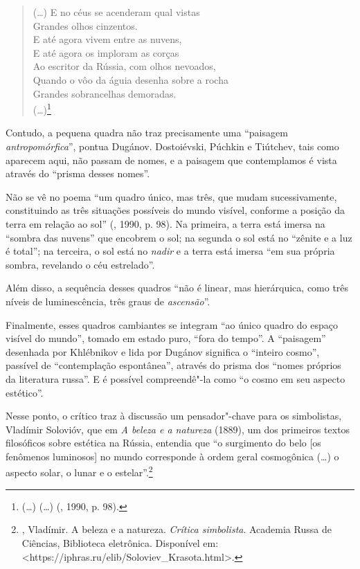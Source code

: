 \begin{verse}
(\ldots{})
E no céus se acenderam qual vistas \\
Grandes olhos cinzentos. \\
E até agora vivem entre as nuvens, \\
E até agora os imploram as corças \\
Ao escritor da Rússia, com olhos nevoados, \\
Quando o vôo da águia desenha sobre a \qb{}rocha \\
Grandes sobrancelhas demoradas. \\
(\ldots{})\footnote{(\ldots{}) {} (\ldots{}) (, 1990, p.
  98).}
\end{verse}

Contudo, a pequena quadra não traz precisamente uma ``paisagem
\emph{antropomórfica}'', pontua Dugánov. Dostoiévski, Púchkin e
Tiútchev, tais como aparecem aqui, não passam de nomes, e a paisagem que
contemplamos é vista através do ``prisma desses nomes''.

Não se vê no poema ``um quadro único, mas três, que
mudam sucessivamente, constituindo as três situações possíveis do mundo
visível, conforme a posição da terra em relação ao sol'' (, 1990, p. 98). Na primeira, a
terra está imersa na ``sombra das nuvens'' que encobrem o sol; na segunda o
sol está no ``zênite e a luz é total''; na terceira, o sol está no \emph{nadir} e a
terra está imersa ``em sua própria sombra, revelando o céu estrelado''.

Além disso, a sequência desses quadros ``não é linear, mas
hierárquica, como três níveis de luminescência, três graus de \emph{ascensão}''.

Finalmente, esses quadros cambiantes se integram ``ao único quadro do
espaço visível do mundo'', tomado em estado puro, ``fora do tempo''. A
``paisagem'' desenhada por Khlébnikov e lida por Dugánov significa o ``inteiro cosmo'', passível de ``contemplação
espontânea'', através do prisma dos ``nomes próprios da literatura russa''.
E é possível compreendê"-la como ``o cosmo em seu aspecto estético''.

Nesse ponto, o crítico traz à discussão um pensador"-chave para os
simbolistas, Vladímir Solovióv, que em \emph{A beleza e a natureza} (1889), um dos primeiros textos filosóficos sobre estética na
Rússia, entendia que ``o surgimento do belo [os fenômenos
luminosos] no mundo corresponde à ordem geral cosmogônica (\ldots{}) o aspecto
solar, o lunar e o estelar''.\footnote{, Vladímir. A beleza e a
  natureza. \emph{Crítica simbolista}. Academia Russa de Ciências,
  Biblioteca eletrônica. Disponível em: \textless{}https://iphras.ru/elib/Soloviev\_Krasota.html\textgreater{}.} 

